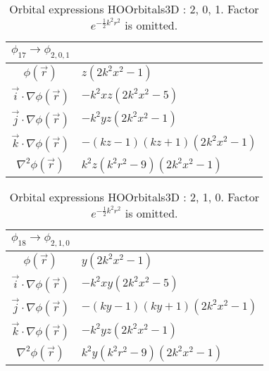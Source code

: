 \begin{table}
\begin{center}
\begin{tabular}{c|l}
$\phi_{17} \rightarrow \phi_{2, 0, 1}$\\
\hline
$\phi(\vec r)$ & $z \left(2 k^{2} x^{2} -1\right)$\\
\hline
$\vec i\cdot \nabla \phi(\vec r)$ & $- k^{2} x z \left(2 k^{2} x^{2} -5\right)$\\
$\vec j\cdot \nabla \phi(\vec r)$ & $- k^{2} y z \left(2 k^{2} x^{2} -1\right)$\\
$\vec k\cdot \nabla \phi(\vec r)$ & $- \left(k z -1\right) \left(k z + 1\right) \left(2 k^{2} x^{2} -1\right)$\\
\hline
$\nabla^2 \phi(\vec r)$ & $k^{2} z \left(k^{2} r^{2} -9\right) \left(2 k^{2} x^{2} -1\right)$\\
\end{tabular}
\caption{Orbital expressions HOOrbitals3D : 2, 0, 1. Factor $e^{- \frac{1}{2} k^{2} r^{2}}$ is omitted.}
\end{center}
\end{table}


\begin{table}
\begin{center}
\begin{tabular}{c|l}
$\phi_{18} \rightarrow \phi_{2, 1, 0}$\\
\hline
$\phi(\vec r)$ & $y \left(2 k^{2} x^{2} -1\right)$\\
\hline
$\vec i\cdot \nabla \phi(\vec r)$ & $- k^{2} x y \left(2 k^{2} x^{2} -5\right)$\\
$\vec j\cdot \nabla \phi(\vec r)$ & $- \left(k y -1\right) \left(k y + 1\right) \left(2 k^{2} x^{2} -1\right)$\\
$\vec k\cdot \nabla \phi(\vec r)$ & $- k^{2} y z \left(2 k^{2} x^{2} -1\right)$\\
\hline
$\nabla^2 \phi(\vec r)$ & $k^{2} y \left(k^{2} r^{2} -9\right) \left(2 k^{2} x^{2} -1\right)$\\
\end{tabular}
\caption{Orbital expressions HOOrbitals3D : 2, 1, 0. Factor $e^{- \frac{1}{2} k^{2} r^{2}}$ is omitted.}
\end{center}
\end{table}


